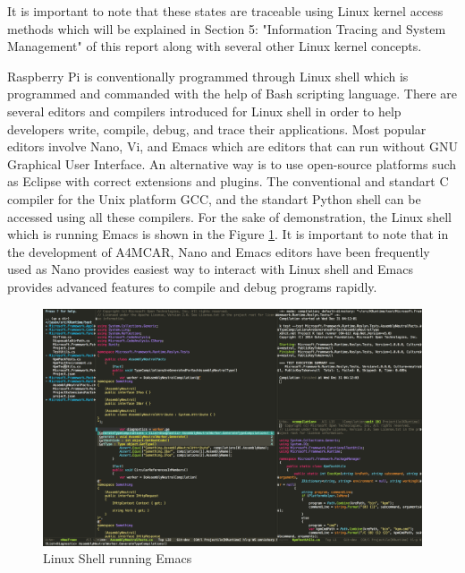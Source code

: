It is important to note that these states are traceable using Linux kernel access methods which will be explained in Section 5: "Information Tracing and System Management" of this report along with several other Linux kernel concepts.

Raspberry Pi is conventionally programmed through Linux shell which is programmed and commanded with the help of Bash scripting language. There are several editors and compilers introduced for Linux shell in order to help developers write, compile, debug, and trace their applications. Most popular editors involve Nano, Vi, and Emacs which are editors that can run without GNU Graphical User Interface. An alternative way is to use open-source platforms such as Eclipse with correct extensions and plugins. The conventional and standart C compiler for the Unix platform GCC, and the standart Python shell can be accessed using all these compilers. For the sake of demonstration, the Linux shell which is running Emacs is shown in the Figure \ref{fig:linuxeditors}. It is important to note that in the development of A4MCAR, Nano and Emacs editors have been frequently used as Nano provides easiest way to interact with Linux shell and Emacs provides advanced features to compile and debug programs rapidly.
\begin{figure}[!ht]
	\includegraphics[scale=0.2]{content/images/linuxeditors.png}
	\caption{Linux Shell running Emacs}
	\label{fig:linuxeditors}
\end{figure}
